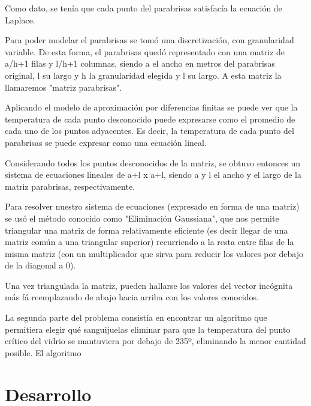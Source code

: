 \documentclass[spanish,a4paper]{article}
\begin{document}
 Como dato, se tenía que cada punto del parabrisas satisfacía la ecuación de Laplace. %

Para poder modelar el parabrisas se tomó una discretización, con granularidad variable. De esta forma, el parabrisas quedó representado con una matriz de a/h+1 filas y l/h+1 columnas, siendo a el ancho en metros del parabrisas original, l su largo y h la granularidad elegida y l su largo. A esta matriz la llamaremos "matriz parabrisas".

Aplicando el modelo de aproximación por diferencias finitas se puede ver que la temperatura de cada punto desconocido puede expresarse como el promedio de cada uno de los puntos adyacentes. Es decir, la temperatura de cada punto del parabrisas se puede expresar como una ecuación lineal. %

Considerando todos los puntos desconocidos de la matriz, se obtuvo entonces un sistema de ecuaciones lineales de a+l x a+l, siendo a y l el ancho y el largo de la matriz parabrisas, respectivamente.


Para resolver nuestro sistema de ecuaciones (expresado en forma de una matriz) se usó el método conocido como "Eliminación Gaussiana", que nos permite triangular una matriz de forma relativamente eficiente (es decir llegar de una matriz común a una triangular superior) recurriendo a la resta entre filas de la misma matriz (con un multiplicador que sirva para reducir los valores por debajo de la diagonal a 0).


Una vez triangulada la matriz, pueden hallarse los valores del vector incógnita más fá reemplazando de abajo hacia arriba con los valores conocidos.

La segunda parte del problema consistía en encontrar un algoritmo que permitiera elegir qué sanguijuelas eliminar para que la temperatura del punto crítico del vidrio se mantuviera por debajo de 235º, eliminando la menor cantidad posible. El algoritmo %


\section{Desarrollo}
\end{document}
